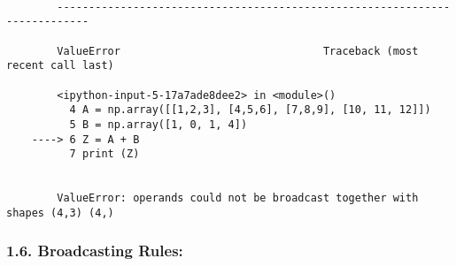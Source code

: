 \documentclass[11pt]{article}
\begin{document}
    \begin{Verbatim}[commandchars=\\\{\}]

        ---------------------------------------------------------------------------

        ValueError                                Traceback (most recent call last)

        <ipython-input-5-17a7ade8dee2> in <module>()
          4 A = np.array([[1,2,3], [4,5,6], [7,8,9], [10, 11, 12]])
          5 B = np.array([1, 0, 1, 4])
    ----> 6 Z = A + B
          7 print (Z)
    

        ValueError: operands could not be broadcast together with shapes (4,3) (4,) 

    \end{Verbatim}

    \hypertarget{broadcasting-rules}{%
\subsubsection{1.6. Broadcasting Rules:}\label{broadcasting-rules}}
\end{document}
